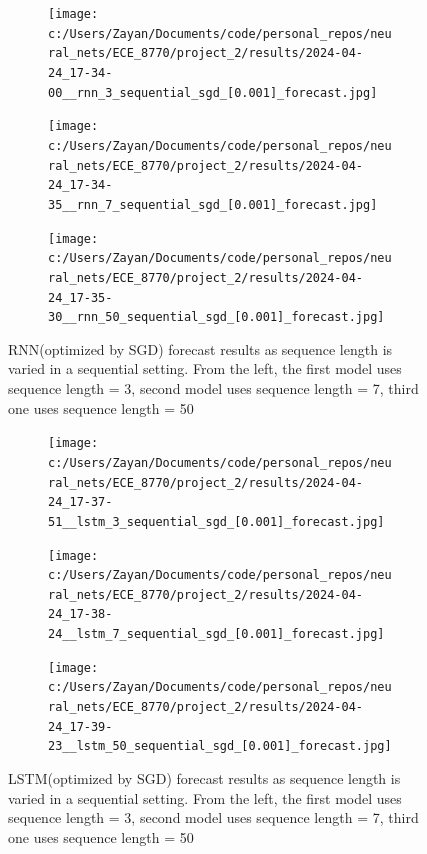 \documentclass[12pt, letterpaper]{article}
\begin{document}
\begin{figure}[htpb]
    \centering
    \begin{subfigure}[b]{0.3\textwidth}
        \texttt{[image: c:/Users/Zayan/Documents/code/personal\_repos/neural\_nets/ECE\_8770/project\_2/results/2024-04-24\_17-34-00\_\_rnn\_3\_sequential\_sgd\_[0.001]\_forecast.jpg]}
    \end{subfigure}
    \begin{subfigure}[b]{0.3\textwidth}
        \texttt{[image: c:/Users/Zayan/Documents/code/personal\_repos/neural\_nets/ECE\_8770/project\_2/results/2024-04-24\_17-34-35\_\_rnn\_7\_sequential\_sgd\_[0.001]\_forecast.jpg]}
    \end{subfigure}
    \begin{subfigure}[b]{0.3\textwidth}
        \texttt{[image: c:/Users/Zayan/Documents/code/personal\_repos/neural\_nets/ECE\_8770/project\_2/results/2024-04-24\_17-35-30\_\_rnn\_50\_sequential\_sgd\_[0.001]\_forecast.jpg]}
    \end{subfigure}
    \caption{RNN(optimized by SGD) forecast results as sequence length is varied in a sequential setting. From 
    the left, the first model uses sequence length = 3, second model uses sequence length = 7, third one uses sequence length = 50}
    \label{fig: SGD-RNN forecast results as sequence length is varied in a sequential setting}
\end{figure}

\begin{figure}[htpb]
    \centering
    \begin{subfigure}[b]{0.3\textwidth}
        \texttt{[image: c:/Users/Zayan/Documents/code/personal\_repos/neural\_nets/ECE\_8770/project\_2/results/2024-04-24\_17-37-51\_\_lstm\_3\_sequential\_sgd\_[0.001]\_forecast.jpg]}
    \end{subfigure}
    \begin{subfigure}[b]{0.3\textwidth}
        \texttt{[image: c:/Users/Zayan/Documents/code/personal\_repos/neural\_nets/ECE\_8770/project\_2/results/2024-04-24\_17-38-24\_\_lstm\_7\_sequential\_sgd\_[0.001]\_forecast.jpg]}
    \end{subfigure}
    \begin{subfigure}[b]{0.3\textwidth}
        \texttt{[image: c:/Users/Zayan/Documents/code/personal\_repos/neural\_nets/ECE\_8770/project\_2/results/2024-04-24\_17-39-23\_\_lstm\_50\_sequential\_sgd\_[0.001]\_forecast.jpg]}
    \end{subfigure}
    \caption{LSTM(optimized by SGD) forecast results as sequence length is varied in a sequential setting. From 
    the left, the first model uses sequence length = 3, second model uses sequence length = 7, third one uses sequence length = 50}
    \label{fig: SGD-LSTM forecast results as sequence length is varied in a sequential setting}
\end{figure}
\end{document}
